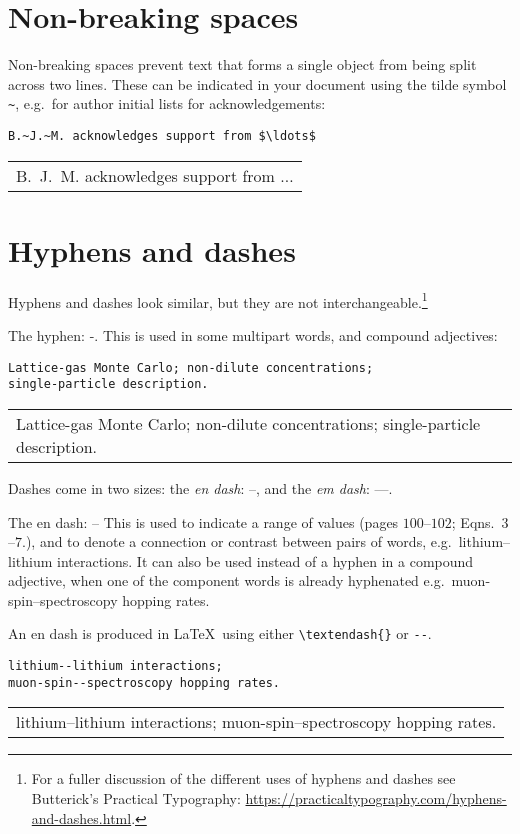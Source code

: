 \documentclass[a4paper]{tufte-handout}
\begin{document}
\section{Non-breaking spaces}
Non-breaking spaces prevent text that forms a single object from being split across two lines. These can be indicated in your document using the tilde symbol \lstinline{~}, e.g.\ for author initial lists for acknowledgements:
\begin{lstlisting}
B.~J.~M. acknowledges support from $\ldots$
\end{lstlisting}
\begin{tabular}{|p{10cm}}
B.~J.~M. acknowledges support from $\ldots$
\end{tabular}

\section{Hyphens and dashes}
Hyphens and dashes look similar, but they are not interchangeable.\footnote{For a fuller discussion of the different uses of hyphens and dashes see Butterick's Practical Typography: \url{https://practicaltypography.com/hyphens-and-dashes.html}.}

The hyphen: -. This is used in some multipart words, and compound adjectives:
\begin{lstlisting}
Lattice-gas Monte Carlo; non-dilute concentrations; 
single-particle description.
\end{lstlisting}
\begin{tabular}{|p{10cm}}
Lattice-gas Monte Carlo; non-dilute concentrations; 
single-particle description.
\end{tabular}


Dashes come in two sizes: the \emph{en dash}: --, and the \emph{em dash}: ---.

The en dash: -- This is used to indicate a range of values (pages $100$--$102$; Eqns.~$3$--$7$.), and to denote a connection or contrast between pairs of words, e.g.\ lithium--lithium interactions. It can also be used instead of a hyphen in a compound adjective, when one of the component words is already hyphenated e.g.\ muon-spin--spectroscopy hopping rates.

An en dash is produced in \LaTeX\ using either \lstinline$\textendash{}$ or \lstinline{--}.
\begin{lstlisting}
lithium--lithium interactions; 
muon-spin--spectroscopy hopping rates.
\end{lstlisting}
\begin{tabular}{|p{10cm}}
lithium--lithium interactions; 
muon-spin--spectroscopy hopping rates.
\end{tabular}
\end{document}
